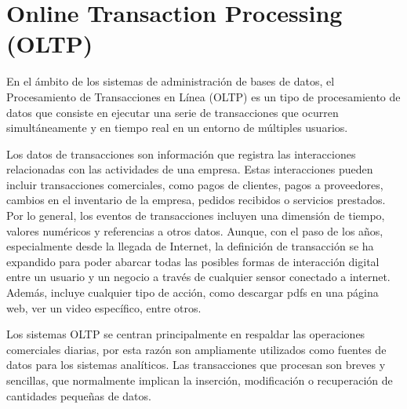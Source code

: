 \section{Online Transaction Processing (OLTP)} \label{section:oltp}

En el ámbito de los sistemas de administración de bases de datos, el Procesamiento de Transacciones en Línea (OLTP) es un 
tipo de procesamiento de datos que consiste en ejecutar una serie de transacciones que ocurren simultáneamente y en 
tiempo real en un entorno de múltiples usuarios\cite{harizopoulos2018oltp}.

Los datos de transacciones son información que registra las interacciones relacionadas con las actividades de una empresa. Estas 
interacciones pueden incluir transacciones comerciales, como pagos de clientes, pagos a proveedores, cambios en el inventario de la empresa, 
pedidos recibidos o servicios prestados. Por lo general, los eventos de transacciones incluyen una dimensión de tiempo, valores numéricos y 
referencias a otros datos\cite{oltpAzure}. Aunque, con el paso de los años, especialmente desde la llegada de 
Internet, la definición de transacción 
se ha expandido para poder abarcar todas las posibles formas de interacción digital entre un usuario y un negocio a través 
de cualquier sensor conectado a internet. Además, incluye cualquier tipo de acción, como descargar pdfs en una 
página web, ver un video específico, entre otros\cite{oltpOracle}.

Los sistemas OLTP se centran principalmente en respaldar las operaciones comerciales diarias, por esta raz\'on son ampliamente 
utilizados como fuentes de datos para los sistemas analíticos. Las transacciones que procesan son breves y 
sencillas, que normalmente implican la inserción, modificación o recuperación de cantidades pequeñas de datos. 

